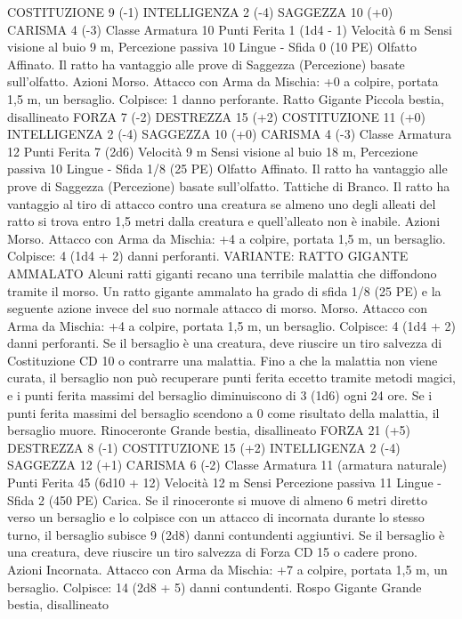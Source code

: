 \begin{multicols}{2}
COSTITUZIONE 9 (-1)
INTELLIGENZA 2 (-4)
SAGGEZZA 10 (+0)
CARISMA 4 (-3)
Classe Armatura 10
Punti Ferita 1 (1d4 - 1)
Velocità 6 m
Sensi visione al buio 9 m, Percezione passiva 10
Lingue -
Sfida 0 (10 PE)
Olfatto Affinato. Il ratto ha vantaggio alle prove di Saggezza
(Percezione) basate sull’olfatto.
Azioni
Morso. Attacco con Arma da Mischia: +0 a colpire, portata 1,5
m, un bersaglio.
Colpisce: 1 danno perforante.
Ratto Gigante
Piccola bestia, disallineato
FORZA 7 (-2)
DESTREZZA 15 (+2)
COSTITUZIONE 11 (+0)
INTELLIGENZA 2 (-4)
SAGGEZZA 10 (+0)
CARISMA 4 (-3)
Classe Armatura 12
Punti Ferita 7 (2d6)
Velocità 9 m
Sensi visione al buio 18 m, Percezione passiva 10
Lingue -
Sfida 1/8 (25 PE)
Olfatto Affinato. Il ratto ha vantaggio alle prove di Saggezza
(Percezione) basate sull’olfatto.
Tattiche di Branco. Il ratto ha vantaggio al tiro di attacco contro
una creatura se almeno uno degli alleati del ratto si trova entro
1,5 metri dalla creatura e quell’alleato non è inabile.
Azioni
Morso. Attacco con Arma da Mischia: +4 a colpire, portata 1,5
m, un bersaglio.
Colpisce: 4 (1d4 + 2) danni perforanti.
VARIANTE: RATTO GIGANTE AMMALATO
Alcuni ratti giganti recano una terribile malattia che diffondono
tramite il morso. Un ratto gigante ammalato ha grado di sfida 1/8
(25 PE) e la seguente azione invece del suo normale attacco di
morso.
Morso. Attacco con Arma da Mischia: +4 a colpire, portata 1,5
m, un bersaglio.
Colpisce: 4 (1d4 + 2) danni perforanti. Se il bersaglio è una
creatura, deve riuscire un tiro salvezza di Costituzione CD 10 o
contrarre una malattia. Fino a che la malattia non viene curata, il
bersaglio non può recuperare punti ferita eccetto tramite metodi
magici, e i punti ferita massimi del bersaglio diminuiscono di 3
(1d6) ogni 24 ore. Se i punti ferita massimi del bersaglio
scendono a 0 come risultato della malattia, il bersaglio muore.
Rinoceronte
Grande bestia, disallineato
FORZA 21 (+5)
DESTREZZA 8 (-1)
COSTITUZIONE 15 (+2)
INTELLIGENZA 2 (-4)
SAGGEZZA 12 (+1)
CARISMA 6 (-2)
Classe Armatura 11 (armatura naturale)
Punti Ferita 45 (6d10 + 12)
Velocità 12 m
Sensi Percezione passiva 11
Lingue -
Sfida 2 (450 PE)
Carica. Se il rinoceronte si muove di almeno 6 metri diretto
verso un bersaglio e lo colpisce con un attacco di incornata
durante lo stesso turno, il bersaglio subisce 9 (2d8) danni
contundenti aggiuntivi. Se il bersaglio è una creatura, deve
riuscire un tiro salvezza di Forza CD 15 o cadere prono.
Azioni
Incornata. Attacco con Arma da Mischia: +7 a colpire, portata
1,5 m, un bersaglio.
Colpisce: 14 (2d8 + 5) danni contundenti.
Rospo Gigante
Grande bestia, disallineato

\end{multicols}
